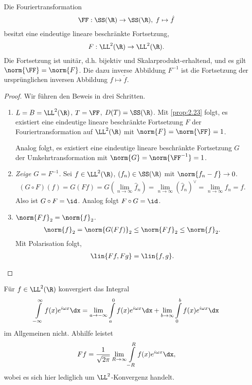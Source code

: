 \begin{prop}
\label{prop:2.24}
Die Fouriertransformation
\begin{align*}
\FF: \SS(\R)\to \SS(\R),\; f\mapsto \hat{f}
\end{align*}
besitzt eine eindeutige lineare beschränkte Fortsetzung,
\begin{align*}
F: \LL^2(\R)\to \LL^2(\R).
\end{align*}
Die Fortsetzung ist unitär, d.h. bijektiv und Skalarprodukt-erhaltend, und es
gilt $\norm{\FF}=\norm{F}$. Die dazu inverse Abbildung
$F^{-1}$ ist die Fortsetzung der ursprünglichen inversen Abbildung $f\mapsto
\check{f}$.\fishhere
\end{prop}
\begin{proof}
Wir führen den Beweis in drei Schritten.
\begin{enumerate}[label=\arabic{*}. Schritt]
  \item $L=B=\LL^2(\R)$, $T=\FF$, $D(T)=\SS(\R)$. Mit \ref{prop:2.23} folgt, es
  existiert eine eindeutige lineare beschränkte Fortsetzung $F$ der
  Fouriertransformation auf $\LL^2(\R)$ mit $\norm{F}=\norm{\FF}=1$.
  
  Analog folgt, es existiert eine eindeutige lineare beschränkte Fortsetzung
  $G$ der Umkehrtransformation mit $\norm{G}=\norm{\FF^{-1}}=1$.
  \item \textit{Zeige $G=F^{-1}$.} Sei $f\in\LL^2(\R)$, $(f_n)\in\SS(\R)$ mit
  $\norm{f_n-f}\to 0$.
\begin{align*}
(G\circ F)(f) = G(Ff) = G\left(\lim\limits_{n\to\infty} \hat{f}_n\right)
= \lim\limits_{n\to\infty} \left(\hat{f}_n\right)^{\lor} =
\lim\limits_{n\to\infty} f_n = f.
\end{align*}
Also ist $G\circ F = \id$. Analog folgt $F\circ G=\id$.
\item $\norm{Ff}_2 = \norm{f}_2$.
\begin{align*}
\norm{f}_2 = \norm{G(Ff)}_2 \le \norm{Ff}_2 \le \norm{f}_2.
\end{align*}
Mit Polarisation folgt,
\begin{align*}
\lin{Ff,Fg} = \lin{f,g}.\qedhere
\end{align*}
\end{enumerate}
\end{proof}

\begin{bem}[Achtung.]
\label{bem:2.25}
Für $f\in\LL^2(\R)$ konvergiert das Integral
\begin{align*}
\int\limits_{-\infty}^\infty f(x)e^{i\omega x}\dx = 
\lim\limits_{a\to-\infty} \int\limits_a^0 f(x)e^{i\omega x}\dx
+ \lim\limits_{b\to\infty} \int\limits_0^b f(x)e^{i\omega x}\dx
\end{align*}
im Allgemeinen nicht. Abhilfe leistet
\begin{align*}
Ff = \frac{1}{\sqrt{2\pi}}\lim\limits_{R\to\infty}\int\limits_{-R}^R
f(x)e^{i\omega x}\dx,
\end{align*}
wobei es sich hier lediglich um $\LL^2$-Konvergenz handelt.\maphere
\end{bem}


